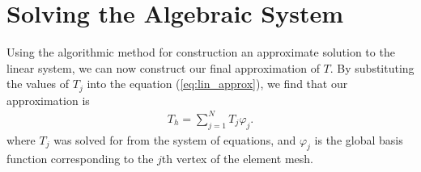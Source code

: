 \documentclass[../fem.tex]{subfiles}
\begin{document}
\section{Solving the Algebraic System}%
\label{sec:solving_the_algebraic_system}

Using the algorithmic method for construction an approximate solution to the
linear system, we can now construct our final approximation of $T$. By
substituting the values of $T_j$ into the equation (\ref{eq:lin_approx}), we
find that our approximation is
\begin{align}\label{eq:approx}
  T_h=\sum_{j=1}^NT_j\varphi_j.
\end{align}
where $T_j$ was solved for from the system of equations, and $\varphi_j$ is the
global basis function corresponding to the $j$th vertex of the element mesh.
\end{document}
